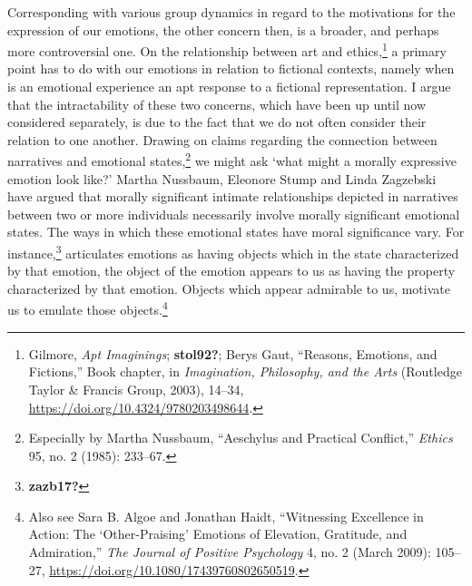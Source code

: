 \documentclass[phdthesis,12pt,final]{wuthesis}
\theoremstyle{definition}
\theoremstyle{definition}
\theoremstyle{definition}
\theoremstyle{definition}
\theoremstyle{remark}
\begin{document}
Corresponding with various group dynamics in regard to the motivations for the expression of our emotions, the other concern then, is a broader, and perhaps more controversial one. On the relationship between art and ethics,\footnote{Gilmore, \emph{Apt {Imaginings}}; \textbf{stol92?}; Berys Gaut, {``Reasons, Emotions, and Fictions,''} Book chapter, in \emph{Imagination, {Philosophy}, and the {Arts}} (Routledge Taylor \& Francis Group, 2003), 14--34, \url{https://doi.org/10.4324/9780203498644}.} a primary point has to do with our emotions in relation to fictional contexts, namely when is an emotional experience an apt response to a fictional representation. I argue that the intractability of these two concerns, which have been up until now considered separately, is due to the fact that we do not often consider their relation to one another. Drawing on claims regarding the connection between narratives and emotional states,\footnote{Especially by Martha Nussbaum, {``Aeschylus and Practical Conflict,''} \emph{Ethics} 95, no. 2 (1985): 233--67.} we might ask `what might a morally expressive emotion look like?' Martha Nussbaum, Eleonore Stump and Linda Zagzebski have argued that morally significant intimate relationships depicted in narratives between two or more individuals necessarily involve morally significant emotional states. The ways in which these emotional states have moral significance vary. For instance,\footnote{\textbf{zazb17?}} articulates emotions as having objects which in the state characterized by that emotion, the object of the emotion appears to us as having the property characterized by that emotion. Objects which appear admirable to us, motivate us to emulate those objects.\footnote{Also see Sara B. Algoe and Jonathan Haidt, {``Witnessing Excellence in Action: The {`Other-Praising'} Emotions of Elevation, Gratitude, and Admiration,''} \emph{The Journal of Positive Psychology} 4, no. 2 (March 2009): 105--27, \url{https://doi.org/10.1080/17439760802650519}.}
\end{document}
